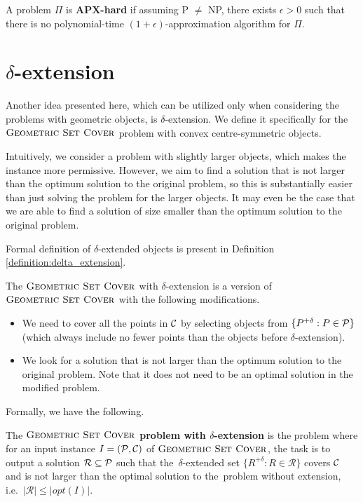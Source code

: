 \begin{defi}
A problem $\Pi$ is \textbf{APX-hard} if assuming P $\neq$ NP,
there exists $\epsilon > 0$
such that there is no polynomial-time $(1+\epsilon)$-approximation algorithm
for $\Pi$.
\end{defi}

\section{$\delta$-extension}
\label{section:def:delta_extension}

Another idea presented here, which can be utilized only when considering
the problems with geometric objects,
is $\delta$-extension.
We define it specifically for the $\textsc{Geometric Set Cover}$ problem
with convex centre-symmetric objects.

Intuitively, we consider a problem with slightly larger objects,
which makes the instance more permissive.
However, we aim to find a solution that
is not larger than the
optimum solution to the original problem,
so this is substantially easier than just
solving the problem for the larger objects.
It may even be the case
that we are able to find a solution
of size smaller than the optimum solution
to the original problem.

Formal definition of $\delta$-extended objects
is present in Definition
\ref{definition:delta_extension}.

The $\textsc{Geometric Set Cover}$ with $\delta$-extension
is a version of $\textsc{Geometric Set Cover}$ with
the following modifications.
\begin{itemize}
\item We need to cover all the points in $\mathcal{C}$
by selecting objects from $\{P^{+\delta} : P \in \mathcal{P}\}$ (which always 
include no fewer points than the objects
before $\delta$-extension).
\item We look for a solution that is not larger than the optimum
solution to the original problem.
Note that it does not need to be an optimal solution in
the modified problem.
\end{itemize}
Formally, we have the following.

\begin{defi}
The \textbf{$\textsc{Geometric Set Cover}$ problem
with $\delta$-extension} is the problem where for an input instance
$I=(\mathcal{P}, \mathcal{C})$ of $\textsc{Geometric Set Cover}$,
the task is to output a solution $\mathcal{R} \subseteq \mathcal{P}$
such that the~$\delta$-extended set
$\{ R^{+\delta} :  R \in \mathcal{R} \}$ covers $\mathcal{C}$
and is not larger than the optimal solution to the~problem without
extension, i.e.~$|\mathcal{R}| \le |opt(I)|$.
\end{defi}

